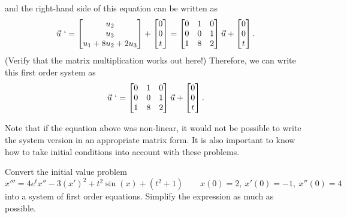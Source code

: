 \documentclass{ximera}
\begin{document}
\begin{exampleSol}
\begin{equation*}
    \end{equation*}
    and the right-hand side of this equation can be written as
    \begin{equation*}
        \vec{u}\ ` =  
        \begin{bmatrix} 
            u_2 \\ 
            u_3 \\ 
            u_1 + 8u_2 + 2u_3 
        \end{bmatrix} + 
        \begin{bmatrix}
            0 \\ 
            0 \\ 
            t 
        \end{bmatrix} = 
        \begin{bmatrix} 
            0 & 1 & 0 \\ 
            0 & 0 & 1 \\ 
            1 & 8 & 2 
        \end{bmatrix} 
        \vec{u} + 
        \begin{bmatrix} 
            0 \\ 
            0 \\ 
            t 
        \end{bmatrix}. 
    \end{equation*}
    (Verify that the matrix multiplication works out here!) Therefore, we can write this first order system as
    \begin{equation*}
        \vec{u}\ ` = 
        \begin{bmatrix} 
            0 & 1 & 0 \\ 
            0 & 0 & 1 \\ 
            1 & 8 & 2 
        \end{bmatrix} 
        \vec{u} + 
        \begin{bmatrix} 
            0 \\ 
            0 \\ 
            t 
        \end{bmatrix}.
    \end{equation*}
\end{exampleSol}

Note that if the equation above was non-linear, it would not be possible to write the system version in an appropriate matrix form. It is also important to know how to take initial conditions into account with these problems.

\begin{example}
    Convert the initial value problem
    \begin{equation*}
        x''' = 4e^t x'' - 3(x')^2 + t^2\sin(x) + (t^2 + 1) \qquad x(0) = 2,\ x'(0) = -1,\ x''(0) = 4
    \end{equation*}
    into a system of first order equations. Simplify the expression as much as possible.
\end{example}
\end{document}
